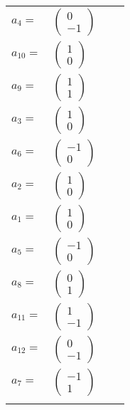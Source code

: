 \documentclass[1p]{elsarticle_modified}
\theoremstyle{definition}
\begin{document}
\begin{tabular}{m{7pt} m{180pt} m{7pt} m{180pt} }
\flushright $a_{4}=$&$\begin{pmatrix}0\\-1\end{pmatrix}$ \\
\flushright $a_{10}=$&$\begin{pmatrix}1\\0\end{pmatrix}$ \\
\flushright $a_{9}=$&$\begin{pmatrix}1\\1\end{pmatrix}$ \\
\flushright $a_{3}=$&$\begin{pmatrix}1\\0\end{pmatrix}$ \\
\flushright $a_{6}=$&$\begin{pmatrix}-1\\0\end{pmatrix}$ \\
\flushright $a_{2}=$&$\begin{pmatrix}1\\0\end{pmatrix}$ \\
\flushright $a_{1}=$&$\begin{pmatrix}1\\0\end{pmatrix}$ \\
\flushright $a_{5}=$&$\begin{pmatrix}-1\\0\end{pmatrix}$ \\
\flushright $a_{8}=$&$\begin{pmatrix}0\\1\end{pmatrix}$ \\
\flushright $a_{11}=$&$\begin{pmatrix}1\\-1\end{pmatrix}$ \\
\flushright $a_{12}=$&$\begin{pmatrix}0\\-1\end{pmatrix}$ \\
\flushright $a_{7}=$&$\begin{pmatrix}-1\\1\end{pmatrix}$\\&\end{tabular}
\end{document}
